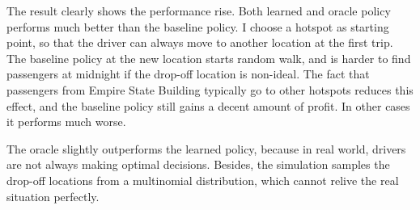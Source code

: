 \documentclass[letterpaper, 10 pt, conference]{ieeeconf}
\begin{document}
The result clearly shows the performance rise. Both learned and oracle policy performs much better than the baseline policy. I choose a hotspot as starting point, so that the driver can always move to another location at the first trip. The baseline policy at the new location starts random walk, and is harder to find passengers at midnight if the drop-off location is non-ideal. The fact that passengers from Empire State Building typically go to other hotspots reduces this effect, and the baseline policy still gains a decent amount of profit. In other cases it performs much worse. 

The oracle slightly outperforms the learned policy, because in real world, drivers are not always making optimal decisions. Besides, the simulation samples the drop-off locations from a multinomial distribution, which cannot relive the real situation perfectly. 
\end{document}
